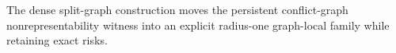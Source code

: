 The dense split-graph construction moves the persistent conflict-graph nonrepresentability witness into an explicit radius-one graph-local family while retaining exact risks.